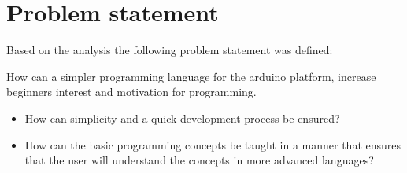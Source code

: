 \section{Problem statement}
Based on the analysis the following problem statement was defined:
\begin{center}
	How can a simpler programming language for the arduino platform, increase beginners interest and motivation for programming.
\end{center}
\begin{itemize}
	\item How can simplicity and a quick development process be ensured?
	\item How can the basic programming concepts be taught in a manner that ensures that the user will understand the concepts in more advanced languages?
\end{itemize}

 